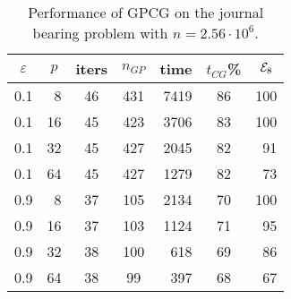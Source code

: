 \documentclass{esub2acm}
\begin{document}
\begin{table}[htbp]
\caption{Performance of GPCG on the journal bearing problem
with $ n = 2.56 \cdot 10^6 $.}
\label{flops-2560K}
\medskip
\begin{center}
\footnotesize
\begin{tabular}{| c r | c c r c r |}
\hline
\multicolumn{1}{|c}{$ \varepsilon $} & 
\multicolumn{1}{c|}{$ p $} & 
\multicolumn{1}{c}{iters} &
\multicolumn{1}{c}{$n_{GP}$} & 
\multicolumn{1}{c}{time} &
\multicolumn{1}{c}{$t_{CG}$\%} & 
\multicolumn{1}{c|}{$ {\cal E}_8 $} \\ \hline
0.1  & 8 & 46 & 431 & 7419 & 86 & 100  \\ 
0.1  & 16 & 45 & 423 & 3706 & 83 & 100  \\
0.1  & 32 & 45 & 427 & 2045 & 82 & 91 \\
0.1  & 64 & 45 & 427 & 1279 & 82 & 73 \\
\hline
0.9  & 8 & 37 & 105 & 2134 & 70 & 100 \\
0.9  & 16 & 37 & 103 & 1124 & 71 & 95 \\
0.9  & 32 & 38 & 100 & 618 & 69 & 86 \\
0.9  & 64 & 38 & 99 & 397 & 68 & 67 \\
\hline
\end{tabular}
\end{center}
\end{table}
\end{document}
